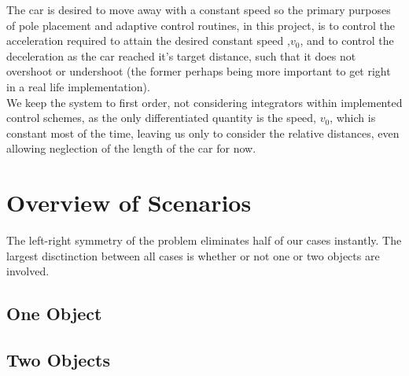 \documentclass[a4paper,onecolumn,amsmath,amssymb]{revtex4-1}
\begin{document}
 
The car is desired to move away with a constant speed so the primary purposes of pole placement and adaptive control routines, in this project, is to control the acceleration required to attain the desired constant speed ,$v_0$, and to control the deceleration as the car reached it's target distance, such that it does not overshoot or undershoot (the former perhaps being more important to get right in a real life implementation).\\


We keep the system to first order, not considering integrators within implemented control schemes, as the only differentiated quantity is the speed, $v_0$, which is constant most of the time,  leaving us only to consider the relative distances, even allowing neglection of the length of the car for now. 

\section{\textbf{Overview of Scenarios}}

The left-right symmetry of the problem eliminates half of our cases instantly. The largest disctinction between all cases is whether or not one or two objects are involved.\\
\subsection{\textbf{One  Object}}

\subsection{\textbf{Two Objects}}
\end{document}
